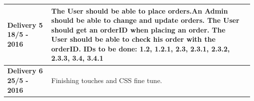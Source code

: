 \documentclass[a4paper,12pt]{article}
\begin{document}
\begin{table}[htbp]
\begin{tabular}{|L{4cm}|L{7cm}|L{4cm}|}
		\textbf{Delivery 5 18/5 - 2016} & The User should be able to place orders.\newline An Admin should be able to change and update orders. \newline The User should get an orderID when placing an order. \newline The User should be able to check his order with the orderID. \newline IDs to be done: 1.2, 1.2.1, 2.3, 2.3.1, 2.3.2, 2.3.3, 3.4, 3.4.1 &                 \\ \hline
		\textbf{Delivery 6 25/5 - 2016} & Finishing touches and CSS fine tune.                                                                                                                                                                                                                                                                                             &                 \\ \hline
	\end{tabular}
\end{table}
\end{document}
